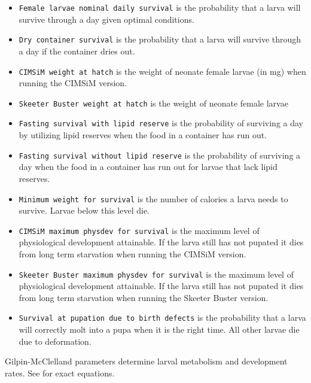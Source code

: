 \documentclass[11pt]{article}
\newcommand{\linecmd}[1]{\texttt{#1}}
\begin{document}
\begin{itemize}
	\item \linecmd{Female larvae nominal daily survival} is the probability that a larva will survive through a day given optimal conditions. 
	\item \linecmd{Dry container survival} is the probability that a larva will survive through a day if the container dries out.
	\item \linecmd{CIMSiM weight at hatch} is the weight of neonate female larvae (in mg) when running the CIMSiM version.
	\item \linecmd{Skeeter Buster weight at hatch} is the weight of neonate female larvae 
	\item \linecmd{Fasting survival with lipid reserve} is the probability of surviving a day by utilizing lipid reserves when the food in a container has run out.
	\item \linecmd{Fasting survival without lipid reserve} is the probability of surviving a day when the food in a container has run out for larvae that lack lipid reserves.
	\item \linecmd{Minimum weight for survival} is the number of calories a larva needs to survive. Larvae below this level die.
	\item \linecmd{CIMSiM maximum physdev for survival} is the maximum level of physiological development attainable. If the larva still has not pupated it dies from long term starvation when running the CIMSiM version.
	\item \linecmd{Skeeter Buster maximum physdev for survival} is the maximum level of physiological development attainable. If the larva still has not pupated it dies from long term starvation when running the Skeeter Buster version.
	\item \linecmd{Survival at pupation due to birth defects} is the probability that a larva will correctly molt into a pupa when it is the right time. All other larvae die due to deformation.
\end{itemize}

Gilpin-McClelland parameters determine larval metabolism and development rates. See\cite{Gilpin79} for exact equations.
\end{document}
